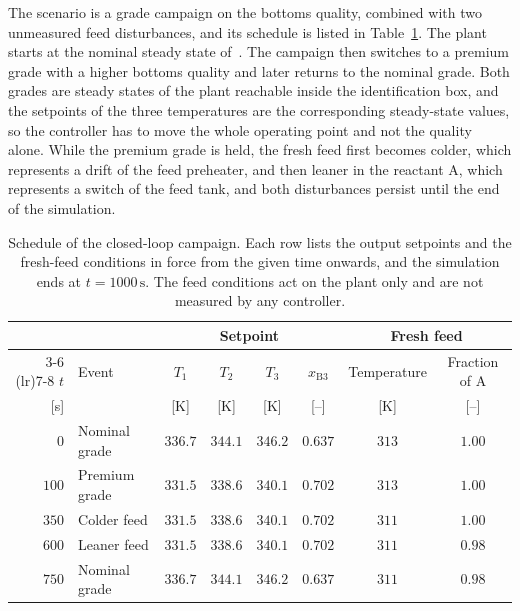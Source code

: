 \documentclass[preprint,12pt,authoryear]{elsarticle}
\theoremstyle{remark}
\begin{document}
The scenario is a grade campaign on the bottoms quality, combined with two unmeasured feed disturbances, and its schedule is listed in Table~\ref{tab:campaign}. The plant starts at the nominal steady state of~\cite{li2019dynamic}. The campaign then switches to a premium grade with a higher bottoms quality and later returns to the nominal grade. Both grades are steady states of the plant reachable inside the identification box, and the setpoints of the three temperatures are the corresponding steady-state values, so the controller has to move the whole operating point and not the quality alone. 
While the premium grade is held, the fresh feed first becomes colder, which represents a drift of the feed preheater, and then leaner in the reactant A, which represents a switch of the feed tank, and both disturbances persist until the end of the simulation.

\begin{table}[htbp]
  \centering
  \small
  \setlength{\tabcolsep}{3pt}
  \caption{Schedule of the closed-loop campaign. Each row lists the output setpoints and the fresh-feed conditions in force from the given time onwards, and the simulation ends at $t = 1000\,\text{s}$. The feed conditions act on the plant only and are not measured by any controller.}
  \label{tab:campaign}
  \begin{tabular}{rlcccccc}
    \toprule
    & & \multicolumn{4}{c}{Setpoint} & \multicolumn{2}{c}{Fresh feed} \\
    \cmidrule(lr){3-6} \cmidrule(lr){7-8}
    $t$ & Event & $T_1$ & $T_2$ & $T_3$ & $x_{\text{B}3}$ & Temperature & Fraction of A \\
    {[s]} & & [K] & [K] & [K] & [--] & [K] & [--] \\
    \midrule
    $0$ & Nominal grade & $336.7$ & $344.1$ & $346.2$ & $0.637$ & $313$ & $1.00$ \\
    $100$ & Premium grade & $331.5$ & $338.6$ & $340.1$ & $0.702$ & $313$ & $1.00$ \\
    $350$ & Colder feed & $331.5$ & $338.6$ & $340.1$ & $0.702$ & $311$ & $1.00$ \\
    $600$ & Leaner feed & $331.5$ & $338.6$ & $340.1$ & $0.702$ & $311$ & $0.98$ \\
    $750$ & Nominal grade & $336.7$ & $344.1$ & $346.2$ & $0.637$ & $311$ & $0.98$ \\
    \bottomrule
  \end{tabular}
\end{table}
\end{document}
